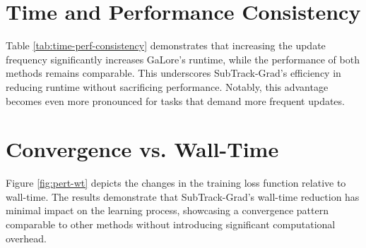 \section{Time and Performance Consistency}
\label{appendix:time-consistency}
Table \ref{tab:time-perf-consistency} demonstrates that increasing the update frequency significantly increases GaLore's runtime, while the performance of both methods remains comparable. This underscores SubTrack-Grad's efficiency in reducing runtime without sacrificing performance. Notably, this advantage becomes even more pronounced for tasks that demand more frequent updates.


\section{Convergence vs. Wall-Time}
\label{appendix:perf-wt}
Figure \ref{fig:pert-wt} depicts the changes in the training loss function relative to wall-time. The results demonstrate that SubTrack-Grad's wall-time reduction has minimal impact on the learning process, showcasing a convergence pattern comparable to other methods without introducing significant computational overhead.


